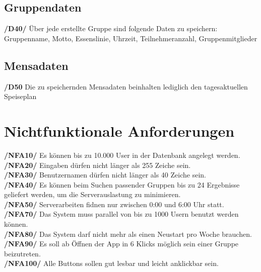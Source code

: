 \documentclass[a4paper]{scrreprt}
\begin{document}
\section{Gruppendaten}

\begin{addmargin}[25pt]{0pt}
\textbf{/D40/} Über jede erstellte Gruppe sind folgende Daten zu speichern:\\
Gruppenname, Motto, Essenslinie, Uhrzeit, Teilnehmeranzahl, Gruppenmitglieder\\
\end{addmargin}

\section{Mensadaten}

\begin{addmargin}[25pt]{0pt}
\textbf{/D50} Die zu speichernden Mensadaten beinhalten lediglich den tagesaktuellen Speiseplan\\
\end{addmargin}



\chapter{Nichtfunktionale Anforderungen}

\begin{addmargin}[25pt]{0pt} 

\textbf{/NFA10/} Es können bis zu 10.000 User in der Datenbank angelegt werden.\\
\textbf{/NFA20/} Eingaben dürfen nicht länger als 255 Zeiche sein.\\
\textbf{/NFA30/} Benutzernamen dürfen nicht länger als 40 Zeiche sein.\\
\textbf{/NFA40/} Es können beim Suchen passender Gruppen bis zu 24 Ergebnisse geliefert werden, um die Serverauslastung zu minimieren.\\
\textbf{/NFA50/} Serverarbeiten fidnen nur zwischen 0:00 und 6:00 Uhr statt.\\
\textbf{/NFA70/} Das System muss parallel von bis zu 1000 Usern benutzt werden können.\\
\textbf{/NFA80/} Das System darf nicht mehr als einen Neustart pro Woche brauchen.\\
\textbf{/NFA90/} Es soll ab Öffnen der App in 6 Klicks möglich sein einer Gruppe beizutreten.\\
\textbf{/NFA100/} Alle Buttons sollen gut lesbar und leicht anklickbar sein.\\

\end{addmargin}
\end{document}
